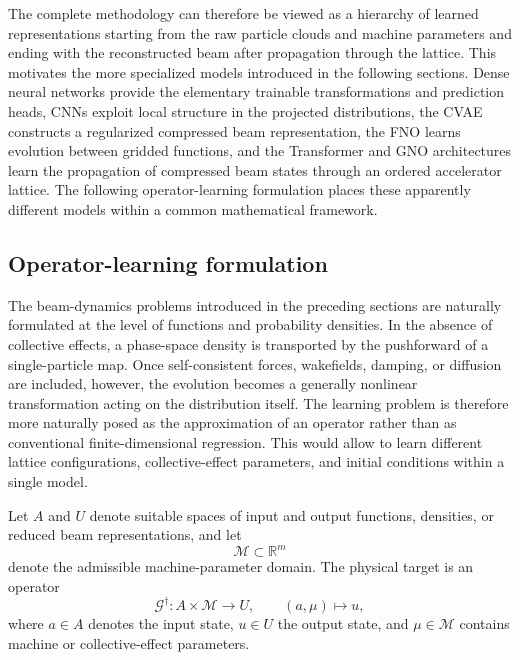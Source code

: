 The complete methodology can therefore be viewed as a hierarchy of learned representations starting from the raw particle clouds and machine parameters and ending with the reconstructed beam after propagation through the lattice. This motivates the more specialized models introduced in the following sections. Dense neural networks provide the elementary trainable transformations and prediction heads, CNNs exploit local structure in the projected distributions, the CVAE constructs a regularized compressed beam representation, the FNO learns evolution between gridded functions, and the Transformer and GNO architectures learn the propagation of compressed beam states through an ordered accelerator lattice. The following operator-learning formulation places these apparently different models within a common mathematical framework.




\subsection{Operator-learning formulation}
\label{subsec:operator_learning_formulation}

The beam-dynamics problems introduced in the preceding sections are naturally formulated at the level of functions and probability densities. In the absence of collective effects, a phase-space density is transported by the pushforward of a single-particle map. Once self-consistent forces, wakefields, damping, or diffusion are included, however, the evolution becomes a generally nonlinear transformation acting on the distribution itself. The learning problem is therefore more naturally posed as the approximation of an operator rather than as conventional finite-dimensional regression. This would allow to learn different lattice configurations, collective-effect parameters, and initial conditions within a single model.

Let $A$ and $U$ denote suitable spaces of input and output functions, densities, or reduced beam representations, and let
\begin{equation}
\mathcal{M}\subset\mathbb{R}^{m}
\end{equation}
denote the admissible machine-parameter domain. The physical target is an operator
\begin{equation}
\mathcal{G}^{\dagger}
:
A\times\mathcal{M}
\longrightarrow
U,
\qquad
(a,\mu)\longmapsto u,
\label{eq:true_operator_revised}
\end{equation}
where $a\in A$ denotes the input state, $u\in U$ the output state, and $\mu\in\mathcal{M}$ contains machine or collective-effect parameters.

